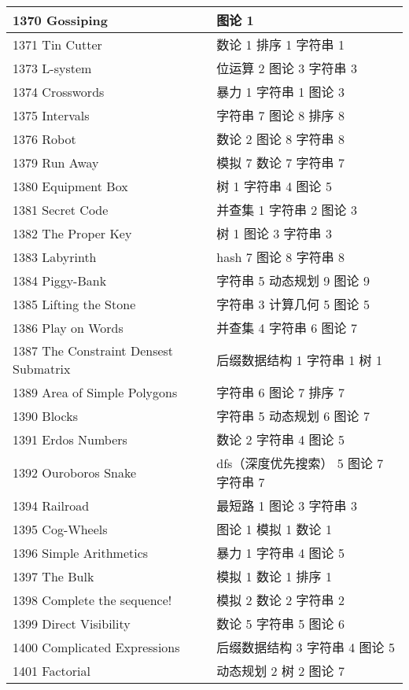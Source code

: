 \begin{longtable}{| p{} | p{} |}
 1370 Gossiping  & 图论 1 \\ \hline
 1371 Tin Cutter  & 数论 1 排序 1 字符串 1 \\ \hline
 1373 L-system  & 位运算 2 图论 3 字符串 3 \\ \hline
 1374 Crosswords  & 暴力 1 字符串 1 图论 3 \\ \hline
 1375 Intervals  & 字符串 7 图论 8 排序 8 \\ \hline
 1376 Robot  & 数论 2 图论 8 字符串 8 \\ \hline
 1379 Run Away  & 模拟 7 数论 7 字符串 7 \\ \hline
 1380 Equipment Box  & 树 1 字符串 4 图论 5 \\ \hline
 1381 Secret Code  & 并查集 1 字符串 2 图论 3 \\ \hline
 1382 The Proper Key  & 树 1 图论 3 字符串 3 \\ \hline
 1383 Labyrinth  & hash 7 图论 8 字符串 8 \\ \hline
 1384 Piggy-Bank  & 字符串 5 动态规划 9 图论 9 \\ \hline
 1385 Lifting the Stone  & 字符串 3 计算几何 5 图论 5 \\ \hline
 1386 Play on Words  & 并查集 4 字符串 6 图论 7 \\ \hline
 1387 The Constraint Densest Submatrix  & 后缀数据结构 1 字符串 1 树 1 \\ \hline
 1389 Area of Simple Polygons  & 字符串 6 图论 7 排序 7 \\ \hline
 1390 Blocks  & 字符串 5 动态规划 6 图论 7 \\ \hline
 1391 Erdos Numbers  & 数论 2 字符串 4 图论 5 \\ \hline
 1392 Ouroboros Snake  & dfs（深度优先搜索） 5 图论 7 字符串 7 \\ \hline
 1394 Railroad  & 最短路 1 图论 3 字符串 3 \\ \hline
 1395 Cog-Wheels  & 图论 1 模拟 1 数论 1 \\ \hline
 1396 Simple Arithmetics  & 暴力 1 字符串 4 图论 5 \\ \hline
 1397 The Bulk  & 模拟 1 数论 1 排序 1 \\ \hline
 1398 Complete the sequence!  & 模拟 2 数论 2 字符串 2 \\ \hline
 1399 Direct Visibility  & 数论 5 字符串 5 图论 6 \\ \hline
 1400 Complicated Expressions  & 后缀数据结构 3 字符串 4 图论 5 \\ \hline
 1401 Factorial  & 动态规划 2 树 2 图论 7 \\ \hline

\end{longtable}
